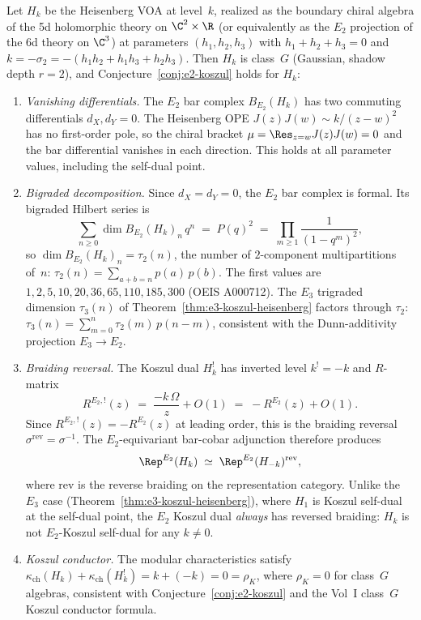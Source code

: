\begin{theorem}
\label{thm:e2-koszul-heisenberg}
Let $H_k$ be the Heisenberg VOA at level~$k$, realized as the boundary
chiral algebra of the 5d holomorphic theory on $\C^2 \times \R$ (or
equivalently as the $E_2$ projection of the 6d theory on $\C^3$) at
parameters $(h_1, h_2, h_3)$ with $h_1 + h_2 + h_3 = 0$ and
$k = -\sigma_2 = -(h_1 h_2 + h_1 h_3 + h_2 h_3)$.
Then $H_k$ is class~$G$ (Gaussian, shadow depth $r = 2$), and
Conjecture~\ref{conj:e2-koszul} holds for $H_k$:
\begin{enumerate}[label=\textup{(\roman*)}]
 \item \emph{Vanishing differentials.} The $E_2$ bar complex
 $B_{E_2}(H_k)$ has two commuting differentials $d_X, d_Y = 0$.
 The Heisenberg OPE $J(z)J(w) \sim k/(z-w)^2$ has no first-order
 pole, so the chiral bracket $\mu = \Res_{z=w} J(z) J(w) = 0$ and the
 bar differential vanishes in each direction. This holds at all parameter
 values, including the self-dual point.

 \item \emph{Bigraded decomposition.} Since $d_X = d_Y = 0$, the $E_2$
 bar complex is formal. Its bigraded Hilbert series is
 \[
 \sum_{n \geq 0} \dim B_{E_2}(H_k)_n \, q^n \;=\; P(q)^2 \;=\;
 \prod_{m \geq 1} \frac{1}{(1-q^m)^2},
 \]
 so $\dim B_{E_2}(H_k)_n = \tau_2(n)$, the number of $2$-component
 multipartitions of~$n$:
 $\tau_2(n) = \sum_{a+b=n} p(a)\,p(b)$.
 The first values are $1, 2, 5, 10, 20, 36, 65, 110, 185, 300$
 (OEIS A000712). The $E_3$ trigraded dimension $\tau_3(n)$ of
 Theorem~\ref{thm:e3-koszul-heisenberg} factors through $\tau_2$:
 $\tau_3(n) = \sum_{m=0}^n \tau_2(m) \, p(n-m)$, consistent with
 the Dunn-additivity projection $E_3 \to E_2$.

 \item \emph{Braiding reversal.} The Koszul dual $H_k^!$ has inverted
 level $k^! = -k$ and $R$-matrix
 \[
 R^{E_2,!}(z) \;=\; \frac{-k\,\Omega}{z} + O(1)
 \;=\; -R^{E_2}(z) + O(1).
 \]
 Since $R^{E_2,!}(z) = -R^{E_2}(z)$ at leading order, this is the
 braiding reversal $\sigma^{\mathrm{rev}} = \sigma^{-1}$. The
 $E_2$-equivariant bar-cobar adjunction therefore produces
 \[
 \Rep^{E_2}(H_k) \;\simeq\; \Rep^{E_2}(H_{-k})^{\mathrm{rev}},
 \]
 where $\mathrm{rev}$ is the reverse braiding on the representation
 category. Unlike the $E_3$ case
 (Theorem~\ref{thm:e3-koszul-heisenberg}), where $H_1$ is Koszul
 self-dual at the self-dual point, the $E_2$ Koszul dual
 \emph{always} has reversed braiding: $H_k$ is not $E_2$-Koszul
 self-dual for any $k \neq 0$.

 \item \emph{Koszul conductor.} The modular characteristics satisfy
 $\kappa_{\mathrm{ch}}(H_k) + \kappa_{\mathrm{ch}}(H_k^!) = k + (-k)
 = 0 = \rho_K$, where $\rho_K = 0$ for class~$G$ algebras, consistent
 with Conjecture~\ref{conj:e2-koszul} and the Vol~I class~$G$ Koszul
 conductor formula.
\end{enumerate}
\end{theorem}

